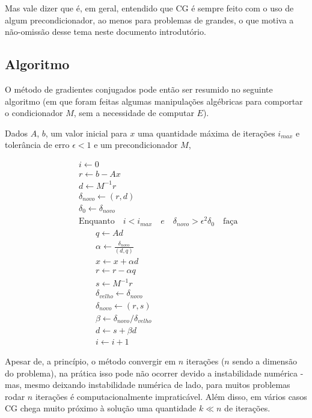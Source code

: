 \documentclass[11pt]{article}
\begin{document}
Mas vale dizer que é, em geral, entendido que CG é sempre feito com o
uso de algum precondicionador, ao menos para problemas de grandes, o que
motiva a não-omissão desse tema neste documento introdutório.

    \subsection{Algoritmo}\label{algoritmo}

O método de gradientes conjugados pode então ser resumido no seguinte
algoritmo (em que foram feitas algumas manipulações algébricas para
comportar o condicionador \(M\), sem a necessidade de computar \(E\)).

Dados \(A\), \(b\), um valor inicial para \(x\) uma quantidade máxima de
iterações \(i_{max}\) e tolerância de erro \(\epsilon < 1\) e um
precondicionador \(M\),

\[
\begin{split}
 &i \leftarrow 0 \\
 &r \leftarrow b - Ax \\
 &d \leftarrow M^{-1}r \\
 &\delta_{novo} \leftarrow (r,d) \\
 &\delta_0 \leftarrow \delta_{novo} \\
 & \text{Enquanto}\quad i < i_{max}\quad e \quad\delta_{novo} > \epsilon^2\delta_0 \quad\text{faça }\\
 & \qquad q \leftarrow Ad \\
 & \qquad \alpha \leftarrow \frac{\delta_{novo}}{(d,q)} \\
 & \qquad x \leftarrow x + \alpha d \\
 & \qquad r \leftarrow r - \alpha q \\
 & \qquad s \leftarrow M^{-1}r \\
 & \qquad \delta_{velho} \leftarrow \delta_{novo} \\
 & \qquad \delta_{novo} \leftarrow (r,s) \\
 & \qquad \beta \leftarrow \delta_{novo}/\delta_{velho} \\
 & \qquad d \leftarrow s + \beta d \\
 & \qquad i \leftarrow i + 1
\end{split}
\]

Apesar de, a princípio, o método convergir em \(n\) iterações (\(n\)
sendo a dimensão do problema), na prática isso pode não ocorrer devido a
instabilidade numérica - mas, mesmo deixando instabilidade numérica de
lado, para muitos problemas rodar \(n\) iterações é computacionalmente
impraticável. Além disso, em vários casos CG chega muito próximo à
solução uma quantidade \(k \ll n\) de iterações.
\end{document}
